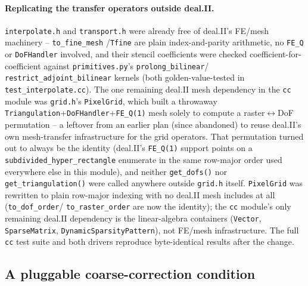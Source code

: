 \documentclass[11pt]{article}
\begin{document}
\paragraph{Replicating the transfer operators outside deal.II.} \texttt{interpolate.h} and
\texttt{transport.h} were already free of deal.II's FE/mesh machinery -- \texttt{to\_fine\_mesh}
/\texttt{Tfine} are plain index-and-parity arithmetic, no \texttt{FE\_Q} or
\texttt{DoFHandler} involved, and their stencil coefficients were checked coefficient-for-
coefficient against \texttt{primitives.py}'s \texttt{prolong\_bilinear}/
\texttt{restrict\_adjoint\_bilinear} kernels (both golden-value-tested in
\texttt{test\_interpolate.cc}). The one remaining deal.II mesh dependency in the \texttt{cc}
module was \texttt{grid.h}'s \texttt{PixelGrid}, which built a throwaway
\texttt{Triangulation}+\texttt{DoFHandler}+\texttt{FE\_Q(1)} mesh solely to compute a
raster$\leftrightarrow$DoF permutation -- a leftover from an earlier plan (since abandoned) to
reuse deal.II's own mesh-transfer infrastructure for the grid operators. That permutation
turned out to always be the identity (deal.II's \texttt{FE\_Q(1)} support points on a
\texttt{subdivided\_hyper\_rectangle} enumerate in the same row-major order used everywhere
else in this module), and neither \texttt{get\_dofs()} nor \texttt{get\_triangulation()} were
called anywhere outside \texttt{grid.h} itself. \texttt{PixelGrid} was rewritten to plain
row-major indexing with no deal.II mesh includes at all (\texttt{to\_dof\_order}/
\texttt{to\_raster\_order} are now the identity); the \texttt{cc} module's only remaining
deal.II dependency is the linear-algebra containers (\texttt{Vector}, \texttt{SparseMatrix},
\texttt{DynamicSparsityPattern}), not FE/mesh infrastructure. The full \texttt{cc} test suite
and both drivers reproduce byte-identical results after the change.

\subsection{A pluggable coarse-correction condition}
\label{sec:condition-design}
\end{document}
